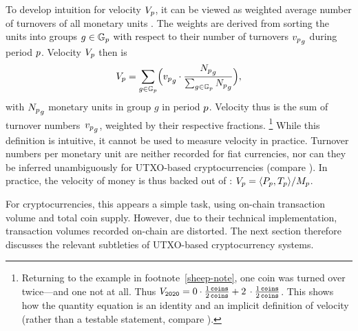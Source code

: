 To develop intuition for velocity \({V_{p}}\), it can be viewed as weighted
average number of turnovers of all monetary units
\citep[cf.][]{friedman2017quantity}. %
The weights are derived from sorting the units into groups $g\in{}{{\mathbb{G}}_{p}}$ with
respect to their number of turnovers ${v_{p}}_g$ during period ${p}$. %
Velocity ${V_{p}}$ then is%
\begin{align}\label{eq:velo_concept}%
  \Vp = \sum_{g\in\Gp}%
  \Bigl(%
  \vp_g \cdot \frac{\Np_g}{\sum_{g\in\Gp} \Np_g}%
  \Bigr)%
  ,%
\end{align}%
with ${N_{p}}_g$ monetary units in group $g$ in period ${p}$. %
Velocity thus is the sum of turnover numbers~${v_{p}}_g$, weighted by their
respective fractions.%
\footnote{%
  Returning to the example in footnote~\ref{sheep-note}, one coin was turned
  over twice---and one not at all. %
  Thus %
  $V_{\mathtt{2020}}= 0 \cdot \frac{%
    1\,\coins%
  }{%
    2\,\coins%
  } + 2\,\cdot \frac{%
    1\,\coins%
  }{%
    2\,\coins%
  }$. %
  This shows how the quantity equation is an identity and an implicit
  definition of velocity (rather than a testable statement, compare
  \cite{friedman2017quantity}).%
} %
While this definition is intuitive, it cannot be used to measure velocity in
practice. %
Turnover numbers per monetary unit are neither recorded for fiat currencies,
nor can they be inferred unambiguously for UTXO-based cryptocurrencies
(compare ). %
In practice, the velocity of money is thus backed out of :
$V_{p} = \langle{P_{p}},{T_{p}}\rangle/{M_{p}}$. %

For cryptocurrencies, this appears a simple task, using on-chain transaction
volume and total coin supply. %
However, due to their technical implementation, transaction volumes recorded
on-chain are distorted. %
The next section therefore discusses the relevant subtleties of UTXO-based
cryptocurrency systems. %


